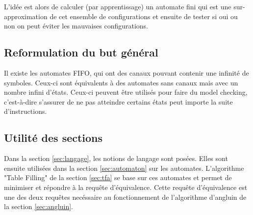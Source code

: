 L’idée est alors de calculer (par apprentissage) un automate fini qui est une sur-approximation de cet ensemble de configurations et ensuite de tester si oui ou non on peut éviter les mauvaises configurations.


\subsection{Reformulation du but général}

Il existe les automates FIFO, qui ont des canaux pouvant contenir une infinité de symboles. Ceux-ci sont équivalents à des automates sans canaux mais avec un nombre infini d'états. Ceux-ci peuvent être utilisés pour faire du model checking, c'est-à-dire s'assurer de ne pas atteindre certains états peut importe la suite d'instructions.

\subsection{Utilité des sections}

Dans la section \ref{sec:langage}, les notions de langage sont posées. Elles sont ensuite utilisées dans la section \ref{sec:automaton} sur les automates. L'algorithme "Table Filling" de la section \ref{sec:tfa} se base sur ces automates et permet de minimiser et répondre à la requête d'équivalence. Cette requête d'équivalence est une des deux requêtes necéssaire au fonctionnement de l'algorithme d'angluin de la section \ref{sec:angluin}.
